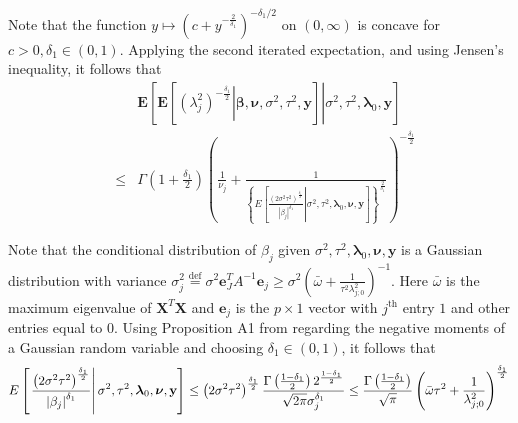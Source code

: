 \documentclass[noinfoline,11pt]{imsart}
\numberwithin{equation}{section}
\theoremstyle{plain}
\newcommand{\y}{\mathbf{y}}
\newcommand{\X}{\mathbf{X}}
\newcommand{\bl}{\boldsymbol{\lambda}}
\newcommand{\E}{\boldsymbol{E}}
\newcommand\Myciteauthor[1]{\citeauthor{#1} \cite{#1}}
\begin{document}
\noindent
Note that the function $y\mapsto\left(c+y^{-\frac{2}{\delta_1}}\right)^{-\delta_1/2}$ on $(0,\infty)$ is concave for $c > 0, \delta_1 \in (0,1)$. Applying the second iterated expectation, and using Jensen's inequality, it follows that 
\begin{eqnarray}
&&    \E\left[\left.\E\left[\left.\left(\lambda_j^2\right)^{-\frac{\delta_1}{2}}\right|\boldsymbol{\beta,\nu},\sigma^2,\tau^2,\mathbf{\y}\right]\right|\sigma^2,\tau^2,\mathbf{\bl}_0,\mathbf{\y}\right]\nonumber \\
     &\leq& \Gamma\left(1+\frac{\delta_1}{2}\right)\left(\frac{1}{\nu_j}+\frac{1}{\left\{E\left[\left.\frac{\left(2\sigma^2\tau^2\right)^{\frac{\delta_1}{2}}}{\left|\beta_j\right|^{\delta_1}}\right|\sigma^2,\tau^2,\mathbf{\lambda}_0,{\boldsymbol \nu},\mathbf{y}\right]\right\}^{\frac{2}{\delta_1}}}\right)^{-\frac{\delta_1}{2}} \label{jensen}
     \end{eqnarray}
     
     \noindent
     Note that the conditional distribution of $\beta_j$ given $\sigma^2,\tau^2,\mathbf{\bl}_0,{\boldsymbol \nu},\mathbf{\y}$ is a Gaussian distribution with variance $\sigma_j^2\overset{\text{def}}{=}\sigma^2\boldsymbol{e}_J^TA^{-1}\boldsymbol{e}_j\geq \sigma^2\left(\bar{\omega}+\frac{1}{\tau^2\lambda_{j;0}^2}\right)^{-1}$. 
     Here $\bar{\omega}$ is the maximum eigenvalue of $\X^T\X$ and $\boldsymbol{e}_j$ is the $p \times 1$ vector with $j^{\text{th}}$ entry $1$ and other entries equal to $0$. Using Proposition A1 from \Myciteauthor{pal2014} regarding the negative moments of a Gaussian random variable and choosing 
     $\delta_1 \in (0,1)$, it follows that 
\begin{equation}
E\left[\left.\frac{\left(2\sigma^2\tau^2\right)^{\frac{\delta_1}{2}}}{\left|\beta_j\right|^{\delta_1}} \right| \sigma^2,\tau^2,\mathbf{\bl}_0,{\boldsymbol \nu},\mathbf{\y} \right]\leq \left(2\sigma^2\tau^2\right)^{\frac{\delta_1}{2}}\frac{\Gamma\left(\frac{1-\delta_1}{2}\right)2^{\frac{1-\delta_1}{2}}}{\sqrt{2\pi} \sigma_j^{\delta_1}} \leq \frac{\Gamma\left(\frac{1-\delta_1}{2}\right)}{\sqrt{\pi}}\left(\bar{\omega}\tau^2+\frac{1}{\lambda_{j;0}^2}\right)^{\frac{\delta_1}{2}} \label{Gaussian:moment}\\
\end{equation}
\end{document}
